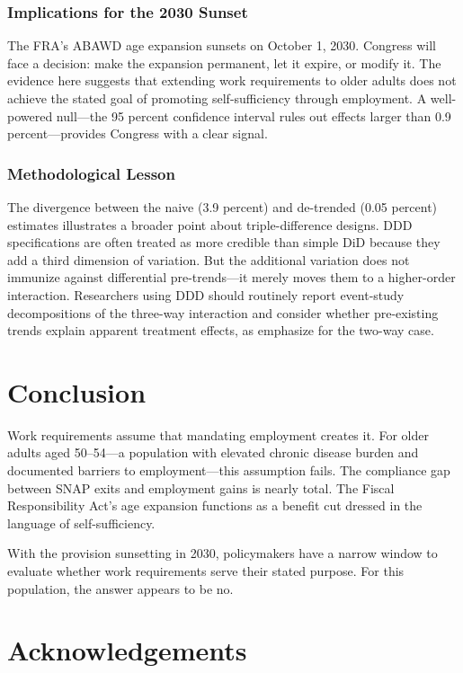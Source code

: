 \documentclass[12pt]{article}
\begin{document}
\subsubsection*{Implications for the 2030 Sunset} The FRA's ABAWD age expansion sunsets on October 1, 2030. Congress will face a decision: make the expansion permanent, let it expire, or modify it. The evidence here suggests that extending work requirements to older adults does not achieve the stated goal of promoting self-sufficiency through employment. A well-powered null---the 95 percent confidence interval rules out effects larger than 0.9 percent---provides Congress with a clear signal.

\subsubsection*{Methodological Lesson} The divergence between the naive (3.9 percent) and de-trended (0.05 percent) estimates illustrates a broader point about triple-difference designs. DDD specifications are often treated as more credible than simple DiD because they add a third dimension of variation. But the additional variation does not immunize against differential pre-trends---it merely moves them to a higher-order interaction. Researchers using DDD should routinely report event-study decompositions of the three-way interaction and consider whether pre-existing trends explain apparent treatment effects, as \citet{rambachan2023more} emphasize for the two-way case.


\section{Conclusion}

Work requirements assume that mandating employment creates it. For older adults aged 50--54---a population with elevated chronic disease burden and documented barriers to employment---this assumption fails. The compliance gap between SNAP exits and employment gains is nearly total. The Fiscal Responsibility Act's age expansion functions as a benefit cut dressed in the language of self-sufficiency.

With the provision sunsetting in 2030, policymakers have a narrow window to evaluate whether work requirements serve their stated purpose. For this population, the answer appears to be no.


\section*{Acknowledgements}
\end{document}
